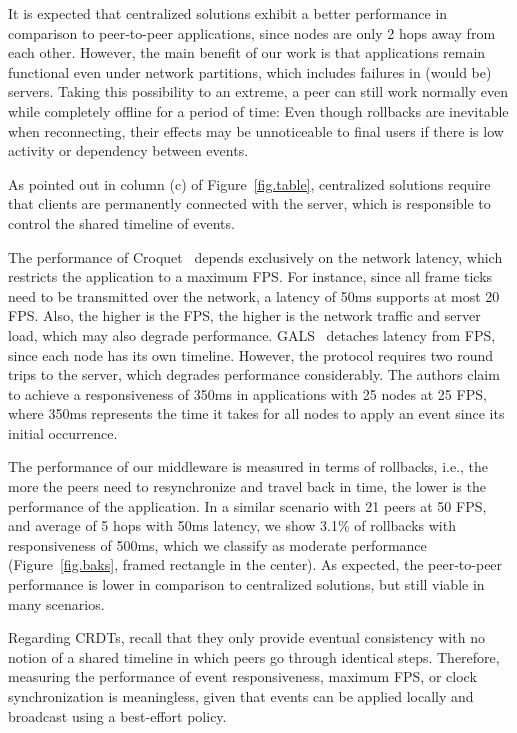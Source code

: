 \documentclass[10pt,journal,compsoc]{IEEEtran}
\begin{document}
It is expected that centralized solutions exhibit a better performance in
comparison to peer-to-peer applications, since nodes are only 2 hops away from
each other.
%
However, the main benefit of our work is that applications remain functional
even under network partitions, which includes failures in (would be) servers.
Taking this possibility to an extreme, a peer can still work normally even
while completely offline for a period of time:
Even though rollbacks are inevitable when reconnecting, their effects may be
unnoticeable to final users if there is low activity or dependency between
events.

As pointed out in column (c) of Figure~\ref{fig.table}, centralized solutions
require that clients are permanently connected with the server, which is
responsible to control the shared timeline of events.

The performance of Croquet~\cite{croquet2} depends exclusively on the network
latency, which restricts the application to a maximum FPS.
For instance, since all frame ticks need to be transmitted over the network,
a latency of 50ms supports at most 20 FPS.
Also, the higher is the FPS, the higher is the network traffic and server load,
which may also degrade performance.
%
GALS~\cite{gals} detaches latency from FPS, since each node has its own
timeline.
However, the protocol requires two round trips to the server, which degrades
performance considerably.
The authors claim to achieve a responsiveness of 350ms in applications with
25 nodes at 25 FPS, where 350ms represents the time it takes for all nodes to
apply an event since its initial occurrence.

The performance of our middleware is measured in terms of rollbacks, i.e., the
more the peers need to resynchronize and travel back in time, the lower is the
performance of the application.
In a similar scenario with 21 peers at 50 FPS, and average of 5 hops with 50ms
latency, we show 3.1\% of rollbacks with responsiveness of 500ms, which we
classify as moderate performance (Figure~\ref{fig.baks}, framed rectangle in
the center).
As expected, the peer-to-peer performance is lower in comparison to centralized
solutions, but still viable in many scenarios.

Regarding CRDTs, recall that they only provide eventual consistency with no
notion of a shared timeline in which peers go through identical steps.
Therefore, measuring the performance of event responsiveness, maximum FPS, or
clock synchronization is meaningless, given that events can be applied locally
and broadcast using a best-effort policy.
\end{document}
